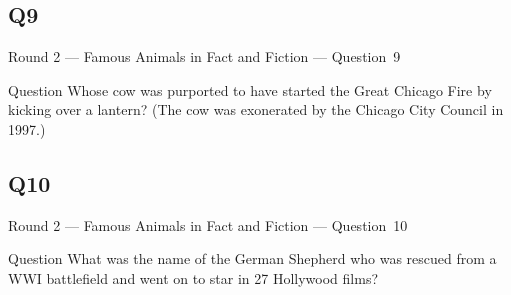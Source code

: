 \documentclass[11pt]{beamer}
\begin{document}
\subsection*{Q9}
\begin{frame}[t]{Round 2 --- Famous Animals in Fact and Fiction --- \mbox{Question 9}}
\vspace{-0.5em}
\begin{block}{Question}
Whose cow was purported to have started the Great Chicago Fire by kicking over a lantern? (The cow was exonerated by the Chicago City Council in 1997.)
\end{block}
\end{frame}
\subsection*{Q10}
\begin{frame}[t]{Round 2 --- Famous Animals in Fact and Fiction --- \mbox{Question 10}}
\vspace{-0.5em}
\begin{block}{Question}
What was the name of the German Shepherd who was rescued from a WWI battlefield and went on to star in 27 Hollywood films?
\end{block}
\end{frame}
\end{document}
